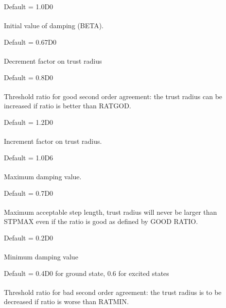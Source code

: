 \begin{description}
\item[]
  Default = 1.0D0\\
   \\
  Initial value of damping (BETA).

\item[]
  Default = 0.67D0\\
   \\
  Decrement factor on trust radius

\item[]
  Default = 0.8D0 \\
   \\
  Threshold ratio for good second order agreement: the trust radius can
  be increased if ratio is better than RATGOD.

\item[]
  Default = 1.2D0\\
   \\
  Increment factor on trust radius.

\item[]
  Default = 1.0D6\\
   \\
  Maximum damping value.

\item[]
  Default = 0.7D0\\
   \\
  Maximum acceptable step length, trust radius will never be larger than
  STPMAX even if the ratio is good as defined by GOOD RATIO.

\item[]
  Default = 0.2D0\\
   \\
  Minimum damping value

\item[]
  Default = 0.4D0 for ground state, 0.6 for excited states\\
   \\
  Threshold ratio for bad second order agreement: the trust radius is
  to be decreased if ratio is worse than RATMIN.


\end{description}
